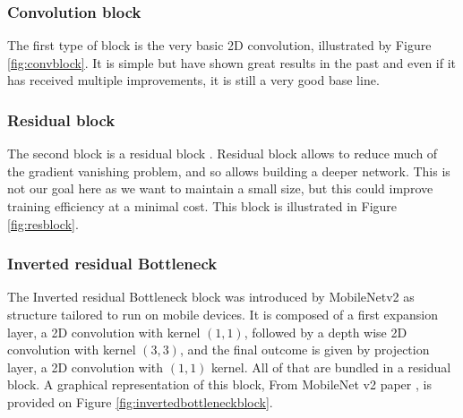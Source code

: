 \subsubsection{Convolution block}
The first type of block is the very basic 2D convolution, illustrated by Figure \ref{fig:convblock}. It is simple but have shown great results in the past and even if it has received multiple improvements, it is still a very good base line.
\subsubsection{Residual block}
The second block is a residual block \cite{szegedy2017inception}. Residual block allows to reduce much of the gradient vanishing problem, and so allows building a deeper network. This is not our goal here as we want to maintain a small size, but this could improve training efficiency at a minimal cost. This block is illustrated in Figure \ref{fig:resblock}.
\subsubsection{Inverted residual Bottleneck}
The Inverted residual Bottleneck block was introduced by MobileNetv2 \cite{sandler2018mobilenetv2} as structure tailored to run on mobile devices. It is composed of a first expansion layer, a 2D convolution with kernel $(1,1)$, followed by a depth wise 2D convolution with kernel $(3,3)$, and the final outcome is given by projection layer, a 2D convolution with $(1,1)$ kernel. All of that are bundled in a residual block. A graphical representation of this block, From MobileNet v2 paper \cite{sandler2018mobilenetv2}, is provided on Figure \ref{fig:invertedbottleneckblock}.

